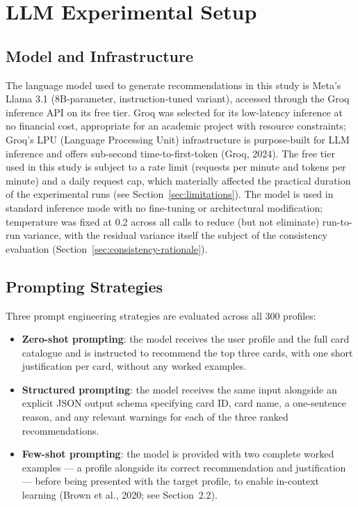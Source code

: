 \section{LLM Experimental Setup}

\subsection{Model and Infrastructure}

The language model used to generate recommendations in this study is Meta's Llama 3.1 (8B-parameter, instruction-tuned variant), accessed through the Groq inference API on its free tier. Groq was selected for its low-latency inference at no financial cost, appropriate for an academic project with resource constraints; Groq's LPU (Language Processing Unit) infrastructure is purpose-built for LLM inference and offers sub-second time-to-first-token (Groq, 2024). The free tier used in this study is subject to a rate limit (requests per minute and tokens per minute) and a daily request cap, which materially affected the practical duration of the experimental runs (see Section~\ref{sec:limitations}). The model is used in standard inference mode with no fine-tuning or architectural modification; temperature was fixed at 0.2 across all calls to reduce (but not eliminate) run-to-run variance, with the residual variance itself the subject of the consistency evaluation (Section~\ref{sec:consistency-rationale}).

\subsection{Prompting Strategies}

Three prompt engineering strategies are evaluated across all 300 profiles:

\begin{itemize}
    \item \textbf{Zero-shot prompting}: the model receives the user profile and the full card catalogue and is instructed to recommend the top three cards, with one short justification per card, without any worked examples.
    \item \textbf{Structured prompting}: the model receives the same input alongside an explicit JSON output schema specifying card ID, card name, a one-sentence reason, and any relevant warnings for each of the three ranked recommendations.
    \item \textbf{Few-shot prompting}: the model is provided with two complete worked examples --- a profile alongside its correct recommendation and justification --- before being presented with the target profile, to enable in-context learning (Brown et al., 2020; see Section~2.2).
\end{itemize}

